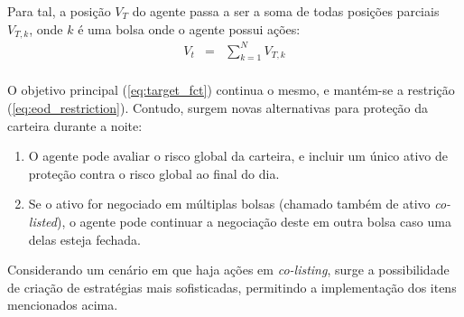 Para tal, a posição $V_{T}$ do agente passa a ser a soma de todas posições parciais $V_{T, k}$, onde $k$ é uma bolsa onde o agente possui ações:
\begin{eqnarray*}
    V_t &=& \sum_{k=1}^N V_{T, k}\\
\end{eqnarray*}

O objetivo principal (\ref{eq:target_fct}) continua o mesmo, e mantém-se a restrição (\ref{eq:eod_restriction}). Contudo, surgem novas alternativas para proteção da carteira durante a noite:

\begin{enumerate}
    \item O agente pode avaliar o risco global da carteira, e incluir um único ativo de proteção contra o risco global ao final do dia.
    \item Se o ativo for negociado em múltiplas bolsas (chamado também de ativo \textit{co-listed}), o agente pode continuar a negociação deste em outra bolsa caso uma delas esteja fechada.
\end{enumerate}

Considerando um cenário em que haja ações em \textit{co-listing}, surge a possibilidade de criação de estratégias mais sofisticadas, permitindo a implementação dos itens mencionados acima.
 
